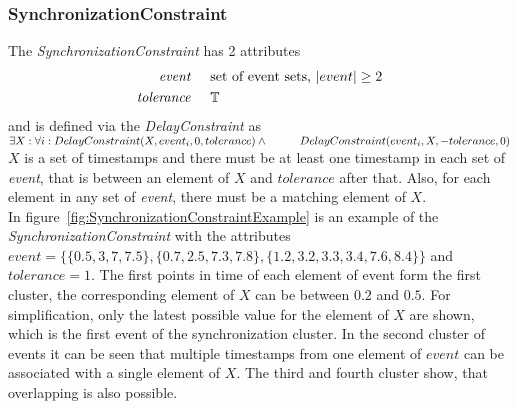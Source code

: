	\subsubsection{SynchronizationConstraint}
		The \emph{SynchronizationConstraint} has 2 attributes
		\begin{align*}
			\emph{event} & \hspace{.5cm}\text{set of event sets, $|event|\geq 2$}\\
			\emph{tolerance} & \hspace{.5cm}\mathbb{T}
		\end{align*}
		and is defined via the \emph{DelayConstraint} as\\[10pt]
		\begin{math}
			\exists X: \forall i: DelayConstraint(X, event_i, 0, tolerance) \land\\
			\text{\hspace{1cm}}DelayConstraint(event_i, X, -tolerance, 0)
		\end{math}\\[10pt]
		$X$ is a set of timestamps and there must be at least one timestamp in each set of \emph{event}, that is between an element of $X$ and $tolerance$ after that. Also, for each element in any set of \emph{event}, there must be a matching element of $X$.\\
		In figure~\ref{fig:SynchronizationConstraintExample} is an example of the \emph{SynchronizationConstraint} with the attributes $event=\{\{0.5, 3, 7, 7.5\}, \{0.7, 2.5, 7.3, 7.8\}, \{1.2, 3.2, 3.3, 3.4, 7.6, 8.4\}\}$ and $tolerance = 1$. The first points in time of each element of event form the first cluster, the corresponding element of $X$ can be between $0.2$ and $0.5$. For simplification, only the latest possible value for the element of $X$ are shown, which is the first event of the synchronization cluster. In the second cluster of events it can be seen that multiple timestamps from one element of $event$ can be associated with a single element of $X$. The third and fourth cluster show, that overlapping is also possible.
